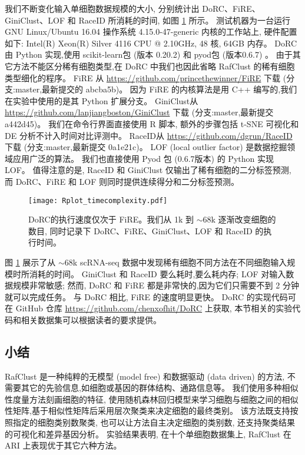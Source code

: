 我们不断变化输入单细胞数据规模的大小,
分别统计出 DoRC、FiRE、GiniClust、LOF \cite{breunig2000lof} 和 RaceID 所消耗的时间,
如图 \ref{fig:timecomplexity} 所示。
测试机器为一台运行 GNU Linux/Ubuntu 16.04 操作系统 4.15.0-47-generic 内核的工作站上,
硬件配置如下: Intel(R) Xeon(R) Silver 4116 CPU @ 2.10GHz, 48 核, 64GB 内存。
DoRC 由 Python 实现,使用 scikit-learn包 (版本 0.20.2) \cite{pedregosa2011scikit}和 pyod包 (版本0.6.7)  \cite{zhao2019pyod}。
由于其它方法不能区分稀有细胞类型,在 DoRC 中我们也因此省略 RafClust 的稀有细胞类型细化的程序。
FiRE 从 \url{https://github.com/princethewinner/FiRE} 下载 (分支:master,最新提交的 abcba5b)。
因为 FiRE 的内核算法是用 C++ 编写的,我们在实验中使用的是其 Python 扩展分支。
GiniClust从 \url{https://github.com/lanjiangboston/GiniClust} 下载 (分支:master,最新提交 a442d45)。
我们在命令行界面直接使用 R 脚本,
额外的步骤包括 t-SNE 可视化和 DE 分析不计入时间对比评测中。
RaceID从 \url{https://github.com/dgrun/RaceID} 下载 (分支:master,最新提交 0a1e21c)。
LOF (local outlier factor) 是数据挖掘领域应用广泛的算法。
我们也直接使用 Pyod 包 (0.6.7版本) \cite{zhao2019pyod} 的 Python 实现 LOF。
值得注意的是, RaceID 和 GiniClust 仅输出了稀有细胞的二分标签预测,
而 DoRC、FiRE 和 LOF 则同时提供连续得分和二分标签预测。
\begin{figure}[!htbp]
    \centering
    \texttt{[image: Rplot\_timecomplexity.pdf]}
    \caption{
    DoRC的执行速度仅次于 FiRE。我们从 1k 到 ${\sim} 68$k 逐渐改变细胞的数目, 同时记录下 DoRC、FiRE、GiniClust、LOF 和 RaceID 的执行时间。    
    }
    \label{fig:timecomplexity}
\end{figure}
图 \ref{fig:timecomplexity} 展示了从 ${\sim}68$k scRNA-seq 数据中发现稀有细胞不同方法在不同细胞输入规模时所消耗的时间。 
GiniClust 和 RaceID 要么耗时,要么耗内存;
LOF 对输入数据规模非常敏感;
然而, DoRC 和 FiRE 都是非常快的,因为它们只需要不到 2 分钟就可以完成任务。
与 DoRC 相比, FiRE 的速度明显更快。
DoRC 的实现代码可在 GitHub 仓库 \url{https://github.com/chenxofhit/DoRC} 上获取,
本节相关的实验代码和相关数据集可以根据读者的要求提供。

\subsection{小结}

RafClust 是一种纯粹的无模型 (model free) 和数据驱动 (data driven) 的方法,
不需要其它的先验信息,如细胞或基因的群体结构、通路信息等。
我们使用多种相似性度量方法刻画细胞的特征,
使用随机森林回归模型来学习细胞与细胞之间的相似性矩阵,基于相似性矩阵后采用层次聚类来决定细胞的最终类别。
该方法既支持按照指定的细胞类别数聚类, 也可以让方法自主决定细胞的类别数,
还支持聚类结果的可视化和差异基因分析。
实验结果表明, 在十个单细胞数据集上, RafClust 在 ARI 上表现优于其它六种方法。


